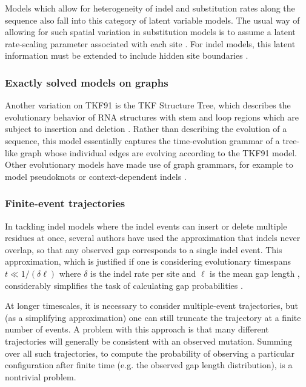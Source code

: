 \documentclass{bmcart}
\begin{document}
Models which allow for heterogeneity of indel and substitution rates along the sequence
also fall into this category of latent variable models. The usual way of allowing for such spatial variation
in substitution models is to assume a latent rate-scaling parameter associated with each site \cite{Yang93,Yang94}.
For indel models, this latent information must be extended to include hidden site boundaries \cite{RivasEddy2015}.

\subsubsection*{Exactly solved models on graphs}

Another variation on TKF91 is the TKF Structure Tree, which describes the evolutionary behavior
of RNA structures with stem and loop regions which are subject to insertion and deletion \cite{Holmes2004}.
Rather than describing the evolution of a sequence,
this model essentially captures the time-evolution grammar of a tree-like graph whose
individual edges are evolving according to the TKF91 model.
Other evolutionary models have made use of graph grammars,
for example to model pseudoknots \cite{MatsuiEtAl2005} or context-dependent indels \cite{HickeyBlanchette2011}.

\subsubsection*{Finite-event trajectories}

In tackling indel models where the indel events can insert or delete multiple residues at once,
several authors have used the approximation that indels never overlap,
so that any observed gap corresponds to a single indel event.
This approximation, which is justified if one is considering evolutionary timespans $t \ll 1/(\delta \ell)$
where $\delta$ is the indel rate per site \color{red} and $\ell$ is the mean gap length \color{black},
considerably simplifies the task of calculating gap probabilities
\cite{KnudsenMiyamoto2003,RedelingsSuchard2005,SuchardRedelings2006,RedelingsSuchard2007,WestessonEtAlArxiv2011,WestessonEtAl2012,WestessonBarquistHolmes2012}.

At longer timescales, it is necessary to consider multiple-event trajectories,
but (as a simplifying approximation) one can still truncate the trajectory at a finite number of events.
A problem with this approach is that many different trajectories will generally be consistent with an observed mutation.
Summing over all such trajectories, to compute the probability of observing a particular configuration after finite time
(e.g. the observed gap length distribution),
is a nontrivial problem.
\end{document}

